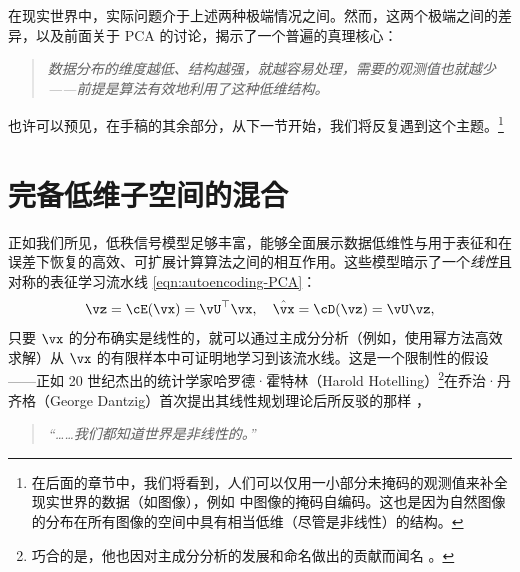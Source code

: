\documentclass[../../book-main_zh.tex]{subfiles}
\begin{document}
在现实世界中，实际问题介于上述两种极端情况之间。然而，这两个极端之间的差异，以及前面关于 PCA 的讨论，揭示了一个普遍的真理核心：
\begin{quote}
    \centering
    \textit{数据分布的维度越低、结构越强，就越容易处理，需要的观测值也就越少——前提是算法有效地利用了这种低维结构。}
\end{quote}
也许可以预见，在手稿的其余部分，从下一节开始，我们将反复遇到这个主题。\footnote{在后面的章节中，我们将看到，人们可以仅用一小部分未掩码的观测值来补全现实世界的数据（如图像），例如
 中图像的掩码自编码。这也是因为自然图像的分布在所有图像的空间中具有相当低维（尽管是非线性）的结构。}

\section{完备低维子空间的混合}%
\label{sec:ica}
正如我们所见，低秩信号模型足够丰富，能够全面展示数据低维性与用于表征和在误差下恢复的高效、可扩展计算算法之间的相互作用。这些模型暗示了一个\textit{线性}且对称的表征学习流水线
\eqref{eqn:autoencoding-PCA}：
\begin{equation*}
    \vz = \cE(\vx) = \vU^\top \vx, \quad \hat{\vx} = \cD(\vz) = \vU \vz,
\end{equation*}
只要 $\vx$ 的分布确实是线性的，就可以通过主成分分析（例如，使用幂方法高效求解）从 $\vx$
的有限样本中可证明地学习到该流水线。这是一个限制性的假设——正如 20 世纪杰出的统计学家哈罗德·霍特林（Harold
Hotelling）\footnote{巧合的是，他也因对主成分分析的发展和命名做出的贡献而闻名
\cite{Hotelling1933}。}在乔治·丹齐格（George Dantzig）首次提出其线性规划理论后所反驳的那样
\cite{Dantzig2002-eh}，
\begin{quote}
    \centering
    \textit{“……我们都知道世界是非线性的。”}
\end{quote}
\end{document}

